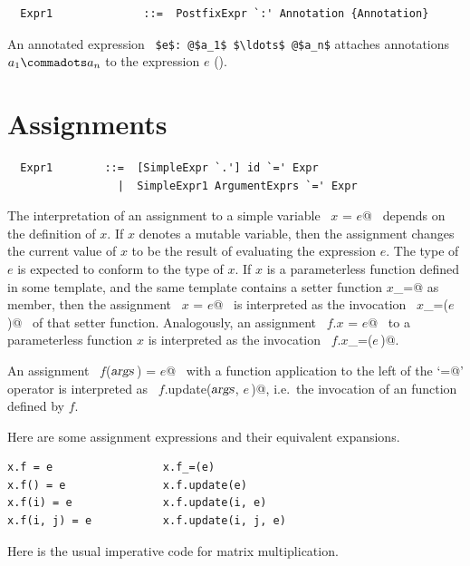 \syntax\begin{lstlisting}
  Expr1              ::=  PostfixExpr `:' Annotation {Annotation} 
\end{lstlisting}

An annotated expression ~\lstinline^$e$: @$a_1$ $\ldots$ @$a_n$^
attaches annotations $a_1 \commadots a_n$ to the expression $e$
().

\section{Assignments}\label{sec:assigments}

\syntax\begin{lstlisting}
  Expr1        ::=  [SimpleExpr `.'] id `=' Expr
                 |  SimpleExpr1 ArgumentExprs `=' Expr
\end{lstlisting}

The interpretation of an assignment to a simple variable ~\lstinline@$x$ = $e$@~
depends on the definition of $x$. If $x$ denotes a mutable
variable, then the assignment changes the current value of $x$ to be
the result of evaluating the expression $e$. The type of $e$ is
expected to conform to the type of $x$. If $x$ is a parameterless
function defined in some template, and the same template contains a
setter function \lstinline@$x$_=@ as member, then the assignment
~\lstinline@$x$ = $e$@~ is interpreted as the invocation
~\lstinline@$x$_=($e\,$)@~ of that setter function.  Analogously, an
assignment ~\lstinline@$f.x$ = $e$@~ to a parameterless function $x$
is interpreted as the invocation ~\lstinline@$f.x$_=($e\,$)@.

An assignment ~\lstinline@$f$($\mbox{\sl args}\,$) = $e$@~ with a function application to the
left of the `\lstinline@=@' operator is interpreted as 
~\lstinline@$f.$update($\mbox{\sl args}$, $e\,$)@, i.e.\
the invocation of an  function defined by $f$.

\example
Here are some assignment expressions and their equivalent expansions.
\begin{lstlisting}
x.f = e                 x.f_=(e)
x.f() = e               x.f.update(e)
x.f(i) = e              x.f.update(i, e)
x.f(i, j) = e           x.f.update(i, j, e)
\end{lstlisting}

\example \label{ex:imp-mat-mul}
Here is the usual imperative code for matrix multiplication.

